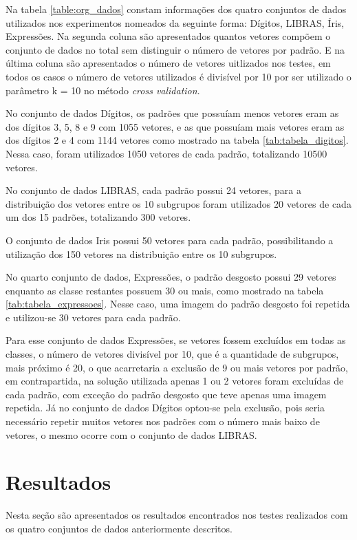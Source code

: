 Na tabela \ref{table:org_dados} constam informações dos quatro conjuntos de dados utilizados nos experimentos nomeados da seguinte forma: Dígitos, LIBRAS, Íris, Expressões. Na segunda coluna são apresentados quantos vetores compõem o conjunto de dados no total sem distinguir o número de vetores por padrão. E na última coluna são apresentados o número de vetores uitlizados nos testes, em todos os casos o número de vetores utilizados é divisível por 10 por ser utilizado o parâmetro k = 10 no método \textit{cross validation}.

No conjunto de dados Dígitos, os padrões que possuíam menos vetores eram as dos dígitos 3, 5, 8 e 9 com 1055 vetores, e as que possuíam mais vetores eram as dos dígitos 2 e 4 com 1144 vetores como mostrado na tabela \ref{tab:tabela_digitos}. Nessa caso, foram utilizados 1050 vetores de cada padrão, totalizando 10500 vetores.

No conjunto de dados LIBRAS, cada padrão possui 24 vetores, para a distribuição dos vetores entre os 10 subgrupos foram utilizados 20 vetores de cada um dos 15 padrões, totalizando 300 vetores.

O conjunto de dados Iris possui 50 vetores para cada padrão, possibilitando a utilização dos 150 vetores na distribuição entre os 10 subgrupos.

No quarto conjunto de dados, Expressões, o padrão desgosto possui 29 vetores enquanto as classe restantes possuem 30 ou mais, como mostrado na tabela \ref{tab:tabela_expressoes}. Nesse caso, uma imagem do padrão desgosto foi repetida e utilizou-se 30 vetores para cada padrão. 

Para esse conjunto de dados Expressões, se vetores fossem excluídos em todas as classes, o número de vetores divisível por 10, que é a quantidade de subgrupos, mais próximo é 20, o que acarretaria a exclusão de 9 ou mais vetores por padrão, em contrapartida, na solução utilizada apenas 1 ou 2 vetores foram excluídas de cada padrão, com exceção do padrão desgosto que teve apenas uma imagem repetida. Já no conjunto de dados Dígitos optou-se pela exclusão, pois seria necessário repetir muitos vetores nos padrões com o número mais baixo de vetores, o mesmo ocorre com o conjunto de dados LIBRAS.

\section{Resultados}
Nesta seção são apresentados os resultados encontrados nos testes realizados com os quatro conjuntos de dados anteriormente descritos. 

